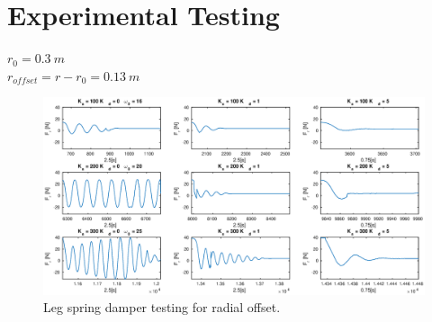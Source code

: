 \chapter{Experimental Testing}

$r_0 = 0.3\ m$\\
$r_{offset} = r - r_0 = 0.13\ m$

\begin{figure}
\centering
\includegraphics[width=1\textwidth]{images/logging/spring-damper-tests.eps} 
\caption{Leg spring damper testing for radial offset.}
\label{fig:spring-damper-tests}
\end{figure}